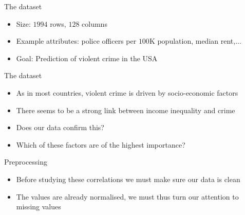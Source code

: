 \documentclass{beamer}
\begin{document}
	\begin{frame}{The dataset}
		\begin{itemize}
			\item Size: $1994$ rows, $128$ columns
			\item Example attributes: police officers per $100$K population, median rent,...
			\item Goal: Prediction of violent crime in the USA
		\end{itemize}		
	\end{frame}
	\begin{frame}{The dataset}
		\begin{itemize}
			\item As in most countries, violent crime is driven by socio-economic factors
			\item There seems to be a strong link between income inequality and crime
			\item Does our data confirm this?
			\item Which of these factors are of the highest importance?
		\end{itemize}
	\end{frame}
	\begin{frame}{Preprocessing}
		\begin{itemize}
			\item Before studying these correlations we must make sure our data is clean
			\item The values are already normalised, we must thus turn our attention to missing values
		\end{itemize}
	\end{frame}
\end{document}
